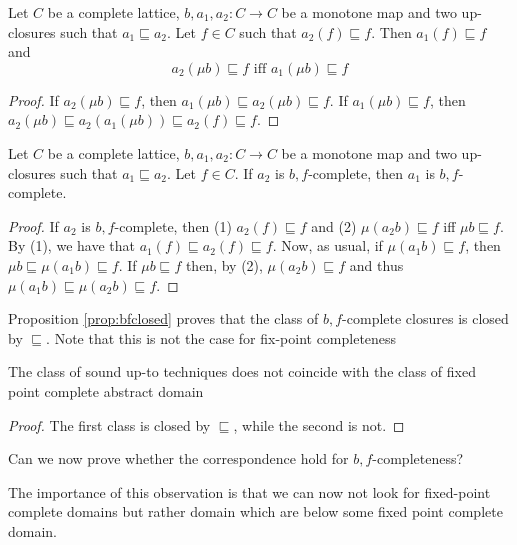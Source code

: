\documentclass{llncs}
\begin{document}
\begin{lemma} Let $C$ be a complete lattice, $b,a_1,a_2\colon C \to C$ be a monotone map and two up-closures such that $a_1\sqsubseteq a_2$. Let $f\in C$ such that $a_2(f)\sqsubseteq f$. Then $a_1(f)\sqsubseteq f$ and
$$ a_2(\mu b) \sqsubseteq f \text{ iff } a_1(\mu b) \sqsubseteq f$$
\end{lemma}
\begin{proof}
If $a_2(\mu b) \sqsubseteq f$, then $a_1(\mu b) \sqsubseteq a_2(\mu b) \sqsubseteq f$.
%
If $a_1(\mu b) \sqsubseteq f$, then $a_2(\mu b) \sqsubseteq a_2(a_1(\mu b)) \sqsubseteq  a_2(f) \sqsubseteq f$.
\end{proof}

\begin{proposition}\label{prop:bfclosed} Let $C$ be a complete lattice, $b,a_1,a_2\colon C \to C$ be a monotone map and two up-closures such that $a_1\sqsubseteq a_2$. Let $f\in C$. If $a_2$ is $b,f$-complete, then $a_1$ is $b,f$-complete.
\end{proposition}
\begin{proof}
If $a_2$ is $b,f$-complete, then (1) $a_2(f)\sqsubseteq f$ and (2) $ \mu (a_2 b) \sqsubseteq f$ iff  $\mu b \sqsubseteq f$. By (1), we have that $a_1(f)\sqsubseteq a_2(f)\sqsubseteq f$.
Now, as usual, if $\mu(a_1b)\sqsubseteq f$, then  $\mu b\sqsubseteq \mu(a_1b)\sqsubseteq f$. If $\mu b \sqsubseteq f$ then, by (2), $ \mu (a_2 b) \sqsubseteq f$ and thus  $\mu (a_1 b) \sqsubseteq  \mu (a_2 b) \sqsubseteq f$.
\end{proof}

Proposition \ref{prop:bfclosed} proves that the class of $b,f$-complete closures is closed by $\sqsubseteq$. Note that this is not the case for fix-point completeness

\begin{theorem}
The class of sound up-to techniques does not coincide with the class of fixed point complete abstract domain
\end{theorem}
\begin{proof}
The first class is closed by $\sqsubseteq$, while the second is not.
\end{proof}

Can we now prove whether the correspondence hold for $b,f$-completeness?

The importance of this observation is that we can now not look for fixed-point complete domains but rather domain which are below some fixed point complete domain.
\end{document}
